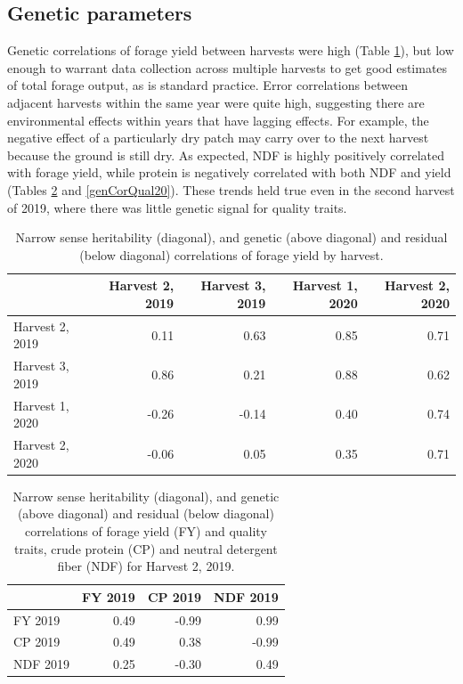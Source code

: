 \documentclass[12pt, letterpaper]{article}
\begin{document}
\subsection{Genetic parameters}

Genetic correlations of forage yield between harvests were high (Table \ref{genCorYld}), but low enough to warrant data collection across multiple harvests to get good estimates of total forage output, as is standard practice. Error correlations between adjacent harvests within the same year were quite high, suggesting there are environmental effects within years that have lagging effects. For example, the negative effect of a particularly dry patch may carry over to the next harvest because the ground is still dry. As expected, NDF is highly positively correlated with forage yield, while protein is negatively correlated with both NDF and yield (Tables \ref{genCorQual19} and \ref{genCorQual20}). These trends held true even in the second harvest of 2019, where there was little genetic signal for quality traits. 



\begin{table}[b]
\caption{Narrow sense heritability (diagonal), and genetic (above diagonal) and residual (below diagonal) correlations of forage yield by harvest.}
\centering
\begin{tabular*}{\hsize}{@{\extracolsep{\fill}}lrrrr}
 & Harvest 2, 2019 & Harvest 3, 2019 & Harvest 1, 2020 & Harvest 2, 2020 \\ 
  \hline
Harvest 2, 2019 & 0.11 & 0.63 & 0.85 & 0.71 \\ 
  Harvest 3, 2019 & 0.86 & 0.21 & 0.88 & 0.62 \\ 
  Harvest 1, 2020 & -0.26 & -0.14 & 0.40 & 0.74 \\ 
  Harvest 2, 2020 & -0.06 & 0.05 & 0.35 & 0.71 \\ 
   \hline
\end{tabular*}
\label{genCorYld}
\end{table}


\begin{table}[ht]
\caption{Narrow sense heritability (diagonal), and genetic (above diagonal) and residual (below diagonal) correlations of forage yield (FY) and quality traits, crude protein (CP) and neutral detergent fiber (NDF) for Harvest 2, 2019.}
\centering
\begin{tabular*}{\hsize}{@{\extracolsep{\fill}}lrrr}
 & FY 2019 & CP 2019 & NDF 2019 \\ 
  \hline
FY 2019 & 0.49 & -0.99 & 0.99 \\ 
  CP 2019 & 0.49 & 0.38 & -0.99 \\ 
  NDF 2019 & 0.25 & -0.30 & 0.49 \\ 
   \hline
\end{tabular*}
\label{genCorQual19}
\end{table}
\end{document}
